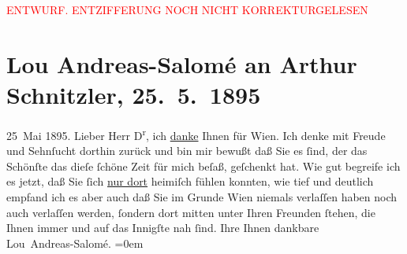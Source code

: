 
\begin{center}
            \textcolor{red}{ENTWURF. ENTZIFFERUNG NOCH NICHT KORREKTURGELESEN}
                      \end{center}
            
               \section[Lou Andreas-Salomé an Arthur Schnitzler, 25. 5. 1895]{ Lou Andreas-Salomé an Arthur Schnitzler, 25. 5. 1895}\nopagebreak{}\rehead{ }\begin{ledgroupsized}[t]{13cm}\normalsize\beginnumbering{} \toendnotes[C]{\smallbreak\pagebreak[2]} 
\pstart
           {\pb}25 Mai 1895.\pend
           \pstart{}Lieber Herr D\textsuperscript{r},\pend\pstart
           ich \uline{danke} Ihnen für Wien. Ich denke mit Freude und Sehnſucht dorthin zurück und bin mir
                    bewußt daß Sie es ſind, der das Schönſte das dieſe ſchöne Zeit für mich beſaß,
                    geſchenkt hat. Wie gut begreife ich es jetzt, daß Sie ſich \uline{nur dort} heimiſch fühlen konnten, wie tief und deutlich empfand
                    ich es aber auch daß Sie im Grunde Wien niemals
                    verlaſſen haben noch auch verlaſſen werden, ſondern dort mitten {\pb}unter Ihren Freunden ſtehen,
                    die Ihnen immer und auf das Innigſte nah ſind.\pend
           \pstart
           Ihre Ihnen dankbare{\\[\baselineskip]}\spacefill\mbox{Lou Andreas-Salomé.}\pend
           \leftskip=0em{}\endnumbering{}\end{ledgroupsized}  \newcommand{\dateiname}{L00445}\newcommand{\titel}{Lou Andreas-Salomé an Arthur Schnitzler, 25. 5. 1895}\newcommand{\editorInnen}{Martin Anton Müller und Gerd-Hermann Susen}
      